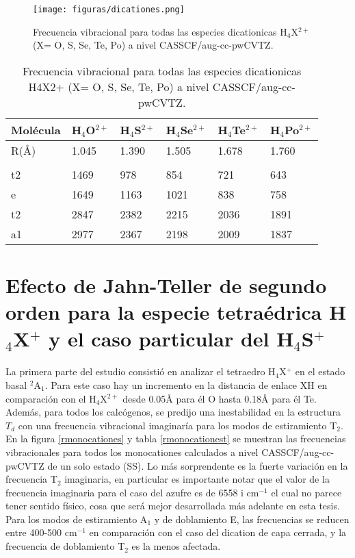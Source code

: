 \documentclass[12pt]{report}
\begin{document}
\begin{figure}[h]
\centering
\texttt{[image: figuras/dicationes.png]} 
\caption{	Frecuencia vibracional para todas las especies dicationicas H$_4$X$^{2+}$ (X= O, S, Se, Te, Po) a nivel CASSCF/aug-cc-pwCVTZ.}
\label{rdicationes}
\end{figure}


\begin{table}[h]
\centering	
\begin{tabular}{l|l|l|l|l|l}
\hline
 Molécula & H$_4$O$^{2+}$ & H$_4$S$^{2+}$ & H$_4$Se$^{2+}$ &  H$_4$Te$^{2+}$ & H$_4$Po$^{2+}$ \\ \hline
R(\AA) & 1.045 & 1.390 & 1.505 & 1.678 & 1.760 \\ 
 &  &  &  &  &  \\ 
 t2 & 1469 & 978 & 854 & 721 & 643 \\ 
e &   1649 & 1163&1021 & 838 & 758 \\ 
t2 & 2847 & 2382 & 2215 & 2036 & 1891 \\
a1 & 2977 & 2367 & 2198 & 2009 & 1837 \\ \hline
\end{tabular}
\caption {Frecuencia vibracional para todas las especies dicationicas H4X2+ (X= O, S, Se, Te, Po) a nivel CASSCF/aug-cc-pwCVTZ.}
\label{rdicationest}
\end{table}



\section{Efecto de Jahn-Teller de segundo orden para la especie tetraédrica H$_4$X$^+$ y el caso particular del H$_4$S$^+$}

La primera parte del estudio consistió en analizar el tetraedro H$_4$X$^+$ en el estado basal $^2$A$_1$. Para este caso hay un incremento en la distancia de enlace XH en comparación con el H$_4$X$^{2+}$ desde 0.05\AA $ $ para él O hasta 0.18\AA $ $ para él Te. Además, para todos los calcógenos, se predijo una inestabilidad en la estructura $T_d$ con una frecuencia vibracional imaginaría para los modos de estiramiento T$_2$. En la figura \ref{rmonocationes} y tabla \ref{rmonocationest} se muestran las frecuencias vibracionales para todos los monocationes calculados a nivel CASSCF/aug-cc-pwCVTZ de un solo estado (SS). Lo más sorprendente es la fuerte variación en la frecuencia T$_2$ imaginaria, en particular es importante notar que el valor de la frecuencia imaginaria para el caso del azufre es de 6558 i cm$^{-1}$ el cual no parece tener sentido físico, cosa que será mejor desarrollada más adelante en esta tesis.  Para los modos de estiramiento A$_1$ y de doblamiento E, las frecuencias se reducen entre 400-500 cm$^{-1}$ en comparación con el caso del dication de capa cerrada, y la frecuencia de doblamiento T$_2$ es la menos afectada.
\end{document}
